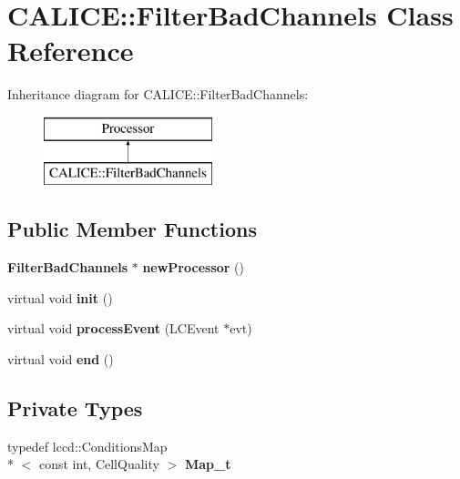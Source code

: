 \section{C\-A\-L\-I\-C\-E\-:\-:Filter\-Bad\-Channels Class Reference}
\label{classCALICE_1_1FilterBadChannels}
Inheritance diagram for C\-A\-L\-I\-C\-E\-:\-:Filter\-Bad\-Channels\-:\begin{figure}[H]
\begin{center}
\leavevmode
\includegraphics[height=2.000000cm]{classCALICE_1_1FilterBadChannels}
\end{center}
\end{figure}
\subsection*{Public Member Functions}
\begin{DoxyCompactItemize}
\item 
{\bf Filter\-Bad\-Channels} $\ast$ {\bfseries new\-Processor} ()\label{classCALICE_1_1FilterBadChannels_a06ad29f11701e24e64b82daa9b36b4ba}

\item 
virtual void {\bfseries init} ()\label{classCALICE_1_1FilterBadChannels_ad75699cb8a346a1dcf712a5c4a8709d9}

\item 
virtual void {\bfseries process\-Event} (L\-C\-Event $\ast$evt)\label{classCALICE_1_1FilterBadChannels_a96a8e4be917781a9f4612e44ad4f61c3}

\item 
virtual void {\bfseries end} ()\label{classCALICE_1_1FilterBadChannels_ac6a5d35d02c2b6c7dcd81a4c37126b2d}

\end{DoxyCompactItemize}
\subsection*{Private Types}
\begin{DoxyCompactItemize}
\item 
typedef lccd\-::\-Conditions\-Map\\*
$<$ const int, Cell\-Quality $>$ {\bfseries Map\-\_\-t}\label{classCALICE_1_1FilterBadChannels_ac0393be0651c887dd3b47a40e186ddfa}

\end{DoxyCompactItemize}
